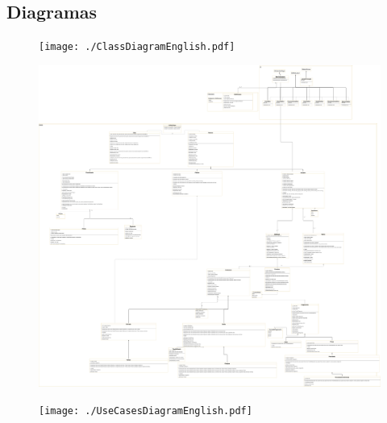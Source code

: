 \documentclass[a4paper,12pt]{article}
\begin{document}
		\subsection{Diagramas}
		\begin{figure}[H]
			\centering \texttt{[image: ./ClassDiagramEnglish.pdf]} 
		\end{figure}
		\begin{figure}[H]
			\centering \includegraphics[width=\textwidth]{./DiagramaDeClassesPortugues.pdf}
		\end{figure}
		\begin{figure}[H]
			\centering \texttt{[image: ./UseCasesDiagramEnglish.pdf]}
		\end{figure}
\end{document}
